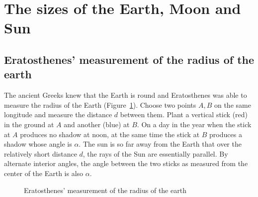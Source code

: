 
\section{The sizes of the Earth, Moon and Sun}\label{s.aristarchus}


\subsection{Eratosthenes' measurement of the radius of the earth}\label{s.eratosthenes}

The ancient Greeks knew that the Earth is round and Eratosthenes was able to measure the radius of the Earth (Figure~\ref{f.eratosthenes}). Choose two points $A,B$ on the same longitude and measure the distance $d$ between them. Plant a vertical stick (red) in the ground at $A$ and another (blue) at $B$. On a day in the year when the stick at $A$ produces no shadow at noon, at the same time the stick at $B$ produces a shadow whose angle is $\alpha$. The sun is so far away from the Earth that over the relatively short distance $d$, the rays of the Sun are essentially parallel. By alternate interior angles, the angle between the two sticks as measured from the center of the Earth is also $\alpha$.

\begin{figure}[b]
\begin{center}
\caption{Eratosthenes' measurement of the radius of the earth}
\label{f.eratosthenes}
\end{center}
\end{figure}

